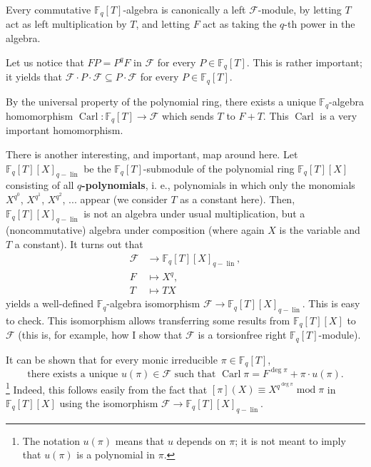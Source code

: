 \documentclass[numbers=enddot,12pt,final,onecolumn,notitlepage]{scrartcl}%
\theoremstyle{definition}
\begin{document}
Every commutative $\mathbb{F}_{q}\left[  T\right]  $-algebra is canonically a
left $\mathcal{F}$-module, by letting $T$ act as left multiplication by $T$,
and letting $F$ act as taking the $q$-th power in the algebra.

Let us notice that $FP=P^{q}F$ in $\mathcal{F}$ for every $P\in\mathbb{F}%
_{q}\left[  T\right]  $. This is rather important; it yields that
$\mathcal{F}\cdot P\cdot\mathcal{F}\subseteq P\cdot\mathcal{F}$ for every
$P\in\mathbb{F}_{q}\left[  T\right]  $.

By the universal property of the polynomial ring, there exists a unique
$\mathbb{F}_{q}$-algebra homomorphism $\operatorname*{Carl}:\mathbb{F}%
_{q}\left[  T\right]  \rightarrow\mathcal{F}$ which sends $T$ to $F+T$. This
$\operatorname*{Carl}$ is a very important homomorphism.

There is another interesting, and important, map around here. Let
$\mathbb{F}_{q}\left[  T\right]  \left[  X\right]  _{q-\operatorname*{lin}}$
be the $\mathbb{F}_{q}\left[  T\right]  $-submodule of the polynomial ring
$\mathbb{F}_{q}\left[  T\right]  \left[  X\right]  $ consisting of all
$q$\textbf{-polynomials}, i. e., polynomials in which only the monomials
$X^{q^{0}}$, $X^{q^{1}}$, $X^{q^{2}}$, $...$ appear (we consider $T$ as a
constant here). Then, $\mathbb{F}_{q}\left[  T\right]  \left[  X\right]
_{q-\operatorname*{lin}}$ is not an algebra under usual multiplication, but a
(noncommutative) algebra under composition (where again $X$ is the variable
and $T$ a constant). It turns out that%
\begin{align*}
\mathcal{F}  &  \rightarrow\mathbb{F}_{q}\left[  T\right]  \left[  X\right]
_{q-\operatorname*{lin}},\\
F  &  \mapsto X^{q},\\
T  &  \mapsto TX
\end{align*}
yields a well-defined $\mathbb{F}_{q}$-algebra isomorphism $\mathcal{F}%
\rightarrow\mathbb{F}_{q}\left[  T\right]  \left[  X\right]
_{q-\operatorname*{lin}}$. This is easy to check. This isomorphism allows
transferring some results from $\mathbb{F}_{q}\left[  T\right]  \left[
X\right]  $ to $\mathcal{F}$ (this is, for example, how I show that
$\mathcal{F}$ is a torsionfree right $\mathbb{F}_{q}\left[  T\right]  $-module).

It can be shown that for every monic irreducible $\pi\in\mathbb{F}_{q}\left[
T\right]  $,%
\begin{equation}
\text{there exists a unique }u\left(  \pi\right)  \in\mathcal{F}\text{ such
that }\operatorname*{Carl}\pi=F^{\deg\pi}+\pi\cdot u\left(  \pi\right)  .
\label{carl.pi}%
\end{equation}
\footnote{The notation $u\left(  \pi\right)  $ means that $u$ depends on $\pi
$; it is not meant to imply that $u\left(  \pi\right)  $ is a polynomial in
$\pi$.} Indeed, this follows easily from the fact that $\left[  \pi\right]
\left(  X\right)  \equiv X^{q^{\deg\pi}}\operatorname{mod}\pi$ in
$\mathbb{F}_{q}\left[  T\right]  \left[  X\right]  $ using the isomorphism
$\mathcal{F}\rightarrow\mathbb{F}_{q}\left[  T\right]  \left[  X\right]
_{q-\operatorname*{lin}}$.
\end{document}
